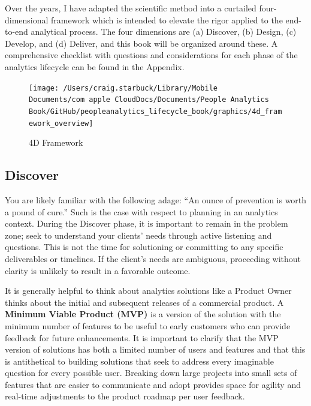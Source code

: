 \documentclass[]{book}
\begin{document}
Over the years, I have adapted the scientific method into a curtailed four-dimensional framework which is intended to elevate the rigor applied to the end-to-end analytical process. The four dimensions are (a) Discover, (b) Design, (c) Develop, and (d) Deliver, and this book will be organized around these. A comprehensive checklist with questions and considerations for each phase of the analytics lifecycle can be found in the Appendix.

\begin{figure}

{\centering \texttt{[image: /Users/craig.starbuck/Library/Mobile Documents/com~apple~CloudDocs/Documents/People Analytics Book/GitHub/peopleanalytics\_lifecycle\_book/graphics/4d\_framework\_overview]} 

}

\caption{4D Framework}\label{fig:4d-framework}
\end{figure}

\hypertarget{discover}{%
\subsection{Discover}\label{discover}}

You are likely familiar with the following adage: ``An ounce of prevention is worth a pound of cure.'' Such is the case with respect to planning in an analytics context. During the Discover phase, it is important to remain in the problem zone; seek to understand your clients' needs through active listening and questions. This is not the time for solutioning or committing to any specific deliverables or timelines. If the client's needs are ambiguous, proceeding without clarity is unlikely to result in a favorable outcome.

It is generally helpful to think about analytics solutions like a Product Owner thinks about the initial and subsequent releases of a commercial product. A \textbf{Minimum Viable Product (MVP)} is a version of the solution with the minimum number of features to be useful to early customers who can provide feedback for future enhancements. It is important to clarify that the MVP version of solutions has both a limited number of users and features and that this is antithetical to building solutions that seek to address every imaginable question for every possible user. Breaking down large projects into small sets of features that are easier to communicate and adopt provides space for agility and real-time adjustments to the product roadmap per user feedback.
\end{document}
